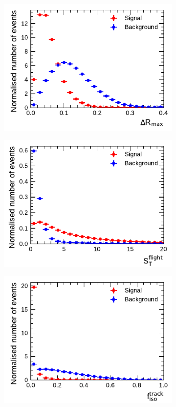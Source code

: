 \begin{figure}[!ht]
\begin{subfigure}{0.5\textwidth}
  \end{subfigure}%
  \begin{subfigure}{0.5\textwidth}
    \centering
    \includegraphics{./figures/baseline_bdt_vars/3p/dRmax.pdf}
  \end{subfigure}
  \begin{subfigure}{0.5\textwidth}
    \centering
    \includegraphics{./figures/baseline_bdt_vars/3p/trFlightPathSig.pdf}
  \end{subfigure}%
  \begin{subfigure}{0.5\textwidth}
    \centering
    \includegraphics{./figures/baseline_bdt_vars/3p/SumPtTrkFrac.pdf}

\end{subfigure}
\end{figure}
